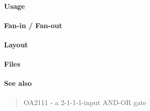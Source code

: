 \paragraph{Usage}

\paragraph{Fan-in / Fan-out}

\paragraph{Layout}

\paragraph{Files}

\paragraph{See also}
\begin{quote}
    OA2111 - a 2-1-1-1-input AND-OR gate
\end{quote}
